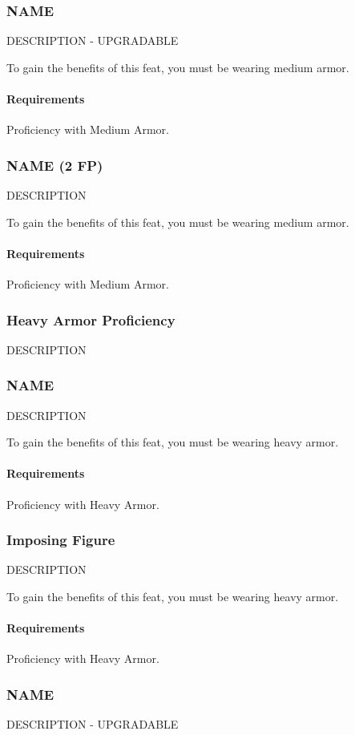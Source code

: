 \subsubsection{NAME} \label{feat::name}
    DESCRIPTION - UPGRADABLE

    To gain the benefits of this feat, you must be wearing medium armor.
    \paragraph{Requirements} Proficiency with Medium Armor.
\subsubsection{NAME (2 FP)} \label{feat::name}
    DESCRIPTION

    To gain the benefits of this feat, you must be wearing medium armor.
    \paragraph{Requirements} Proficiency with Medium Armor.
\subsubsection{Heavy Armor Proficiency} \label{feat::name}
    DESCRIPTION
\subsubsection{NAME} \label{feat::name}
    DESCRIPTION

    To gain the benefits of this feat, you must be wearing heavy armor.
    \paragraph{Requirements} Proficiency with Heavy Armor.
\subsubsection{Imposing Figure} \label{feat::imposingfigure}
    DESCRIPTION

    To gain the benefits of this feat, you must be wearing heavy armor.
    \paragraph{Requirements} Proficiency with Heavy Armor.
\subsubsection{NAME} \label{feat::name}
    DESCRIPTION - UPGRADABLE

